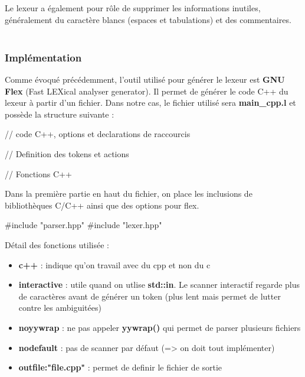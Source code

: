 \documentclass[a4paper]{article}%
\begin{document}
Le lexeur a également pour rôle de supprimer les informations inutiles,
généralement du caractère blancs (espaces et tabulations) et des
commentaires.\\~\\

\subsubsection*{Implémentation}

Comme évoqué précédemment, l'outil utilisé pour générer le lexeur est
\textbf{GNU Flex} (Fast LEXical analyser generator). Il permet de générer le
code C++ du lexeur à partir d'un fichier. Dans notre cas, le fichier utilisé
sera \textbf{main\_cpp.l} et possède la structure suivante
\cite{compilerFlexBison} :

\begin{code}
// code C++, options et declarations de raccourcis

// Definition des tokens et actions

// Fonctions C++
\end{code}\leavevmode\newline

\noindent

Dans la première partie en haut du fichier, on place les inclusions de
bibliothèques C/C++ ainsi que des options pour flex.

\begin{code}
#include "parser.hpp"
#include "lexer.hpp"

\end{code}\leavevmode\newline

Détail des fonctions utilisée :
\begin{itemize}
  \item \textbf{c++} : indique qu'on travail avec du cpp et non du c
  \item \textbf{interactive} : utile quand on utlise \textbf{std::in}. Le
    scanner interactif regarde plus de caractères avant de générer un token
    (plus lent mais permet de lutter contre les ambiguitées)
  \item \textbf{noyywrap} : ne pas appeler \textbf{yywrap()} qui permet de parser plusieurs fichiers
  \item \textbf{nodefault} : pas de scanner par défaut (=> on doit tout implémenter)
  \item \textbf{outfile:"file.cpp"} : permet de definir le fichier de sortie
\end{itemize}\leavevmode\\
\end{document}
